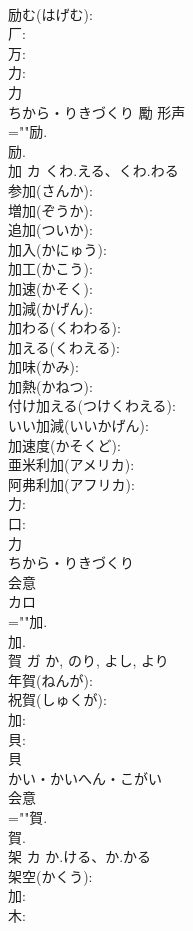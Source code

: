 \documentclass[8pt]{extreport}
\begin{document}
\begin{CJK}{UTF8}{min}
\\	励む(はげむ): 
\\	厂: 
\\	万: 
\\	力: 
\\	力	
\\	ちから・りきづくり	勵	形声 
\\	=""励.
\\	励.
\\	加	カ	くわ.える、くわ.わる		
\\	参加(さんか): 
\\	増加(ぞうか): 
\\	追加(ついか): 
\\	加入(かにゅう): 
\\	加工(かこう): 
\\	加速(かそく): 
\\	加減(かげん): 
\\	加わる(くわわる): 
\\	加える(くわえる): 
\\	加味(かみ): 
\\	加熱(かねつ): 
\\	付け加える(つけくわえる): 
\\	いい加減(いいかげん): 
\\	加速度(かそくど): 
\\	亜米利加(アメリカ): 
\\	阿弗利加(アフリカ): 
\\	力: 
\\	口: 
\\	力	
\\	ちから・りきづくり	
\\	会意 
\\	カロ
\\	=""加.
\\	加.
\\	賀	ガ		か, のり, よし, より	
\\	年賀(ねんが): 
\\	祝賀(しゅくが): 
\\	加: 
\\	貝: 
\\	貝	
\\	かい・かいへん・こがい	
\\	会意 
\\	=""賀.
\\	賀.
\\	架	カ	か.ける、か.かる		
\\	架空(かくう): 
\\	加: 
\\	木: 

\end{CJK}
\end{document}
